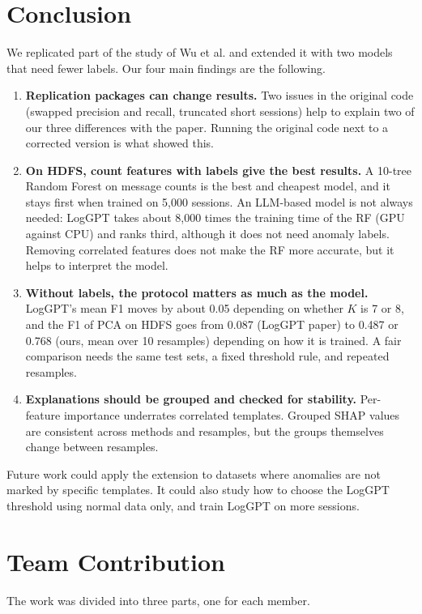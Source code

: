 \documentclass[10pt, conference]{IEEEtran}
\begin{document}
\section{Conclusion}
\label{sec:conclusion}

We replicated part of the study of Wu et al. and extended it with two models that need fewer labels. Our four main findings are the following.

\begin{enumerate}
\item \textbf{Replication packages can change results.} Two issues in the original code (swapped precision and recall, truncated short sessions) help to explain two of our three differences with the paper. Running the original code next to a corrected version is what showed this.
\item \textbf{On HDFS, count features with labels give the best results.} A 10-tree Random Forest on message counts is the best and cheapest model, and it stays first when trained on 5,000 sessions. An LLM-based model is not always needed: LogGPT takes about 8,000 times the training time of the RF (GPU against CPU) and ranks third, although it does not need anomaly labels. Removing correlated features does not make the RF more accurate, but it helps to interpret the model.
\item \textbf{Without labels, the protocol matters as much as the model.} LogGPT's mean F1 moves by about 0.05 depending on whether $K$ is 7 or 8, and the F1 of PCA on HDFS goes from 0.087 (LogGPT paper) to 0.487 or 0.768 (ours, mean over 10 resamples) depending on how it is trained. A fair comparison needs the same test sets, a fixed threshold rule, and repeated resamples.
\item \textbf{Explanations should be grouped and checked for stability.} Per-feature importance underrates correlated templates. Grouped SHAP values are consistent across methods and resamples, but the groups themselves change between resamples.
\end{enumerate}

Future work could apply the extension to datasets where anomalies are not marked by specific templates. It could also study how to choose the LogGPT threshold using normal data only, and train LogGPT on more sessions.

\section{Team Contribution}
\label{sec:contribution}
The work was divided into three parts, one for each member.
\end{document}
